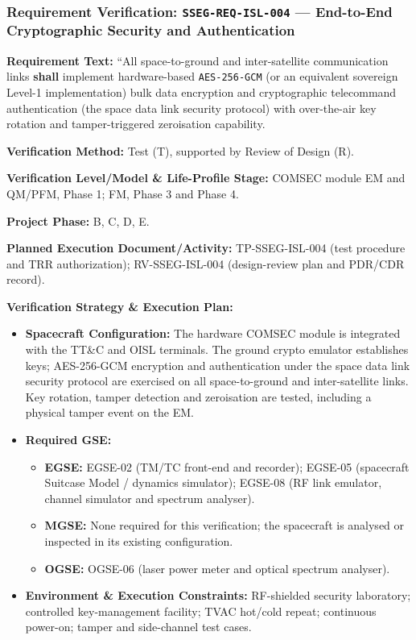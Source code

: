 \subsubsection{Requirement Verification: \texttt{SSEG-REQ-ISL-004} --- End-to-End Cryptographic Security and Authentication}
\label{ver:SSEG-REQ-ISL-004}
\textbf{Requirement Text:} ``All space-to-ground and inter-satellite communication links \textbf{shall} implement hardware-based \texttt{AES-256-GCM} (or an equivalent sovereign Level-1 implementation) bulk data encryption and cryptographic telecommand authentication (the space data link security protocol) with over-the-air key rotation and tamper-triggered zeroisation capability.
\par\textbf{Verification Method:} Test (T), supported by Review of Design (R).
\par\textbf{Verification Level/Model \& Life-Profile Stage:} COMSEC module EM and QM/PFM, Phase 1; FM, Phase 3 and Phase 4.
\par\textbf{Project Phase:} B, C, D, E.
\par\textbf{Planned Execution Document/Activity:} TP-SSEG-ISL-004 (test procedure and TRR authorization); RV-SSEG-ISL-004 (design-review plan and PDR/CDR record).
\par\textbf{Verification Strategy \& Execution Plan:}
\begin{itemize}
\item \textbf{Spacecraft Configuration:} The hardware COMSEC module is integrated with the TT\&C and OISL terminals. The ground crypto emulator establishes keys; AES-256-GCM encryption and authentication under the space data link security protocol are exercised on all space-to-ground and inter-satellite links. Key rotation, tamper detection and zeroisation are tested, including a physical tamper event on the EM.
\item \textbf{Required GSE:}
\begin{itemize}
\item \textbf{EGSE:} EGSE-02 (TM/TC front-end and recorder); EGSE-05 (spacecraft Suitcase Model / dynamics simulator); EGSE-08 (RF link emulator, channel simulator and spectrum analyser).
\item \textbf{MGSE:} None required for this verification; the spacecraft is analysed or inspected in its existing configuration.
\item \textbf{OGSE:} OGSE-06 (laser power meter and optical spectrum analyser).
\end{itemize}
\item \textbf{Environment \& Execution Constraints:} RF-shielded security laboratory; controlled key-management facility; TVAC hot/cold repeat; continuous power-on; tamper and side-channel test cases.
\end{itemize}
